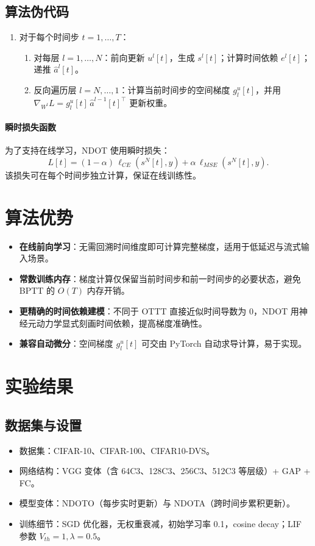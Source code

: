 \documentclass[journal,12pt,onecolumn]{IEEEtran}
\begin{document}
\subsection{算法伪代码}
\begin{enumerate}[leftmargin=*]
  \item 对于每个时间步 $t=1,\dots,T$：
    \begin{enumerate}
      \item 对每层 $l=1,\dots,N$：前向更新 $u^l[t]$，生成 $s^l[t]$；计算时间依赖 $e^l[t]$；递推 $\hat{a}^l[t]$。
      \item 反向遍历层 $l=N,\dots,1$：计算当前时间步的空间梯度 $g^u_l[t]$，并用 $\nabla_{W^l}L = g^u_l[t] \, \hat{a}^{l-1}[t]^\top$ 更新权重。
    \end{enumerate}
\end{enumerate}

\paragraph{瞬时损失函数}
为了支持在线学习，NDOT 使用瞬时损失：
\begin{equation}
  L[t] = (1-\alpha)\,\ell_{CE}(s^N[t], y) + \alpha\,\ell_{MSE}(s^N[t], y).
\end{equation}
该损失可在每个时间步独立计算，保证在线训练性。

\section{算法优势}
\begin{itemize}[leftmargin=*]
  \item \textbf{在线前向学习}：无需回溯时间维度即可计算完整梯度，适用于低延迟与流式输入场景。
  \item \textbf{常数训练内存}：梯度计算仅保留当前时间步和前一时间步的必要状态，避免 BPTT 的 $O(T)$ 内存开销。
  \item \textbf{更精确的时间依赖建模}：不同于 OTTT 直接近似时间导数为 0，NDOT 用神经元动力学显式刻画时间依赖，提高梯度准确性。
  \item \textbf{兼容自动微分}：空间梯度 $g^u_l[t]$ 可交由 PyTorch 自动求导计算，易于实现。
\end{itemize}

\section{实验结果}
\subsection{数据集与设置}
\begin{itemize}[leftmargin=*]
  \item 数据集：CIFAR-10、CIFAR-100、CIFAR10-DVS。
  \item 网络结构：VGG 变体（含 64C3、128C3、256C3、512C3 等层级）+ GAP + FC。
  \item 模型变体：NDOTO（每步实时更新）与 NDOTA（跨时间步累积更新）。
  \item 训练细节：SGD 优化器，无权重衰减，初始学习率 0.1，cosine decay；LIF 参数 $V_{th}=1, \lambda=0.5$。
\end{itemize}
\end{document}
